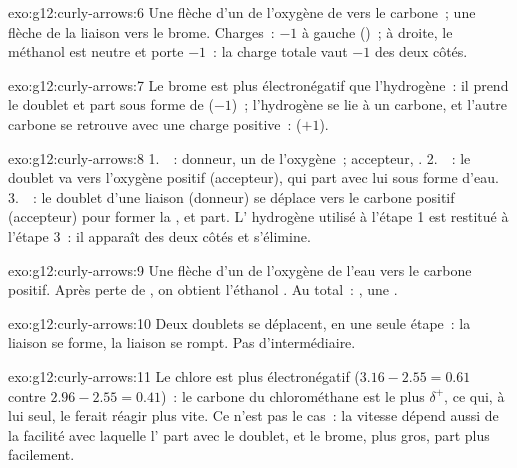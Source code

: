 \begin{solution}{exo:g12:curly-arrows:6}
Une flèche d'un  de l'oxygène de  vers le
carbone~; une flèche de la liaison  vers le brome. Charges~:
$-1$ à gauche
()~; à droite, le méthanol est neutre et  porte $-1$~:
la charge totale vaut $-1$ des deux côtés.
\end{solution}

\begin{solution}{exo:g12:curly-arrows:7}
Le brome est plus électronégatif que l'hydrogène~: il prend le doublet
et part sous forme de  ($-1$)~; l'hydrogène se lie à un carbone,
et l'autre carbone se retrouve avec une charge positive~:
 ($+1$).
\end{solution}

\begin{solution}{exo:g12:curly-arrows:8}
1.~~: donneur, un 
de l'oxygène~; accepteur, .
2.~~: le doublet
 va vers l'oxygène positif (accepteur), qui part avec lui sous
forme d'eau. 3.~~: le doublet d'une
liaison  (donneur) se déplace vers le carbone positif
(accepteur) pour former la , et  part. L'
hydrogène utilisé à l'étape 1 est restitué à l'étape 3~: il apparaît des
deux côtés et s'élimine.
\end{solution}

\begin{solution}{exo:g12:curly-arrows:9}
Une flèche d'un  de l'oxygène de l'eau vers le carbone
positif. Après perte de , on obtient l'éthanol
. Au total~:
, une .
\end{solution}

\begin{solution}{exo:g12:curly-arrows:10}
Deux doublets se déplacent, en une seule étape~: la liaison  se
forme, la liaison  se rompt. Pas d'intermédiaire.
\end{solution}

\begin{solution}{exo:g12:curly-arrows:11}
Le chlore est plus électronégatif ($3.16 - 2.55 = 0.61$ contre
$2.96 - 2.55 = 0.41$)~: le carbone du chlorométhane est le plus
$\delta^+$, ce qui, à lui seul, le ferait réagir plus vite. Ce n'est pas
le cas~: la vitesse dépend aussi de la facilité avec laquelle l'
part avec le doublet, et le brome, plus gros, part plus facilement.
\end{solution}

